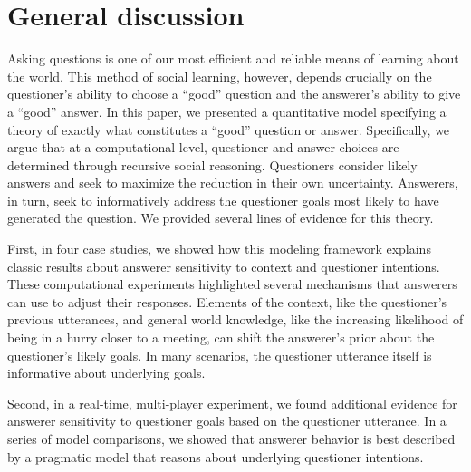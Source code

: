 \documentclass[12pt, floatsintext, jou]{apa6}
\begin{document}
\section{General discussion}
\label{sec:gd}


Asking questions is one of our most efficient and reliable means of learning about the world. This method of social learning, however, depends crucially on the questioner's ability to choose a ``good'' question and the answerer's ability to give a ``good'' answer. In this paper, we presented a quantitative model specifying a theory of exactly what constitutes a ``good'' question or answer. Specifically, we argue that at a computational level, questioner and answer choices are determined through recursive social reasoning. Questioners consider likely answers and seek to maximize the reduction in their own uncertainty. Answerers, in turn, seek to informatively address the questioner goals most likely to have generated the question. We provided several lines of evidence for this theory. 

First, in four case studies, we showed how this modeling framework explains classic results about answerer sensitivity to context and questioner intentions. These computational experiments highlighted several mechanisms that answerers can use to adjust their responses. Elements of the context, like the questioner's previous utterances, and general world knowledge, like the increasing likelihood of being in a hurry closer to a meeting, can shift the answerer's prior about the questioner's likely goals. In many scenarios, the questioner utterance itself is informative about underlying goals. 


Second, in a real-time, multi-player experiment, we found additional evidence for answerer sensitivity to questioner goals based on the questioner utterance. In a series of model comparisons, we showed that answerer behavior is best described by a pragmatic model that reasons about underlying questioner intentions. %
\end{document}
